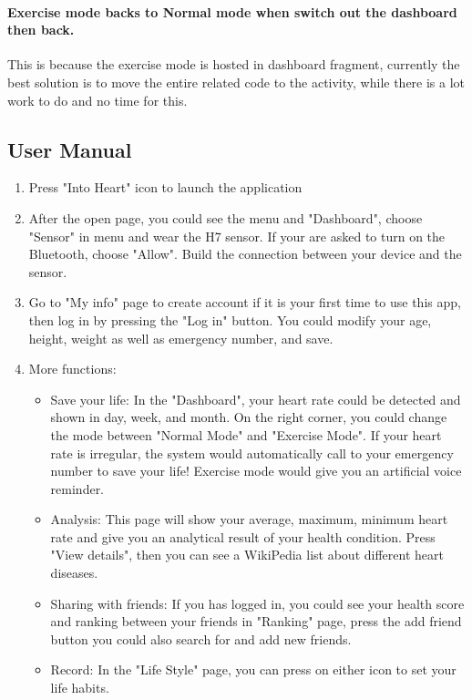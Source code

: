 \documentclass[10pt,a4paper,final]{scrartcl}
\begin{document}
\paragraph{Exercise mode backs to Normal mode when switch out the dashboard then back.} This is because the exercise mode is hosted in dashboard fragment, currently the best solution is to move the entire related code to the activity, while there is a lot work to do and no time for this.

\subsection{User Manual}
\begin{enumerate}
\item Press "Into Heart" icon to launch the application 
\item After the open page, you could see the menu and "Dashboard", choose "Sensor" in menu and wear the H7 sensor. If your are asked to turn on the Bluetooth, choose "Allow". Build the connection between your device and the sensor. 
\item Go to "My info" page to create account if it is your first time to use this app, then log in by pressing the "Log in" button. You could modify your age, height, weight as well as emergency number, and save.  
\item More functions: 
\begin{itemize}
\item Save your life: In the "Dashboard", your heart rate could be detected and shown in day, week, and month. On the right corner, you could change the mode between "Normal Mode" and "Exercise Mode". If your heart rate is irregular, the system would automatically call to your emergency number to save your life! Exercise mode would give you an artificial voice reminder. 
\item Analysis: This page will show your average, maximum, minimum heart rate and give you an analytical result of your health condition. Press "View details", then you can see a WikiPedia list about different heart diseases.  
\item Sharing with friends: If you has logged in, you could see your health score and ranking between your friends in "Ranking" page, press the add friend button you could also search for and add new friends. 
\item Record: In the "Life Style" page, you can press on either icon to set your life habits. 
\end{itemize}
\end{enumerate}

 
 
\end{document}
